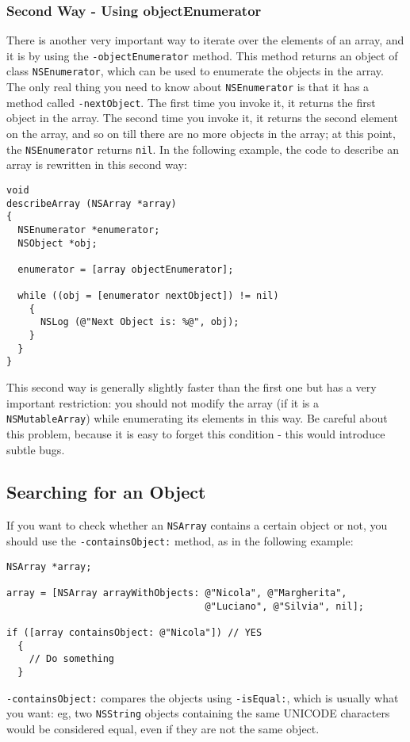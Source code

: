 \documentclass[a4paper]{article}
\begin{document}
\subsubsection{Second Way - Using objectEnumerator}
There is another very important way to iterate over the elements of an
array, and it is by using the \texttt{-objectEnumerator} method.  This
method returns an object of class \texttt{NSEnumerator}, which can be
used to enumerate the objects in the array.  The only real thing you
need to know about \texttt{NSEnumerator} is that it has a method
called \texttt{-nextObject}.  The first time you invoke it, it returns
the first object in the array.  The second time you invoke it, it
returns the second element on the array, and so on till there are no
more objects in the array; at this point, the \texttt{NSEnumerator}
returns \texttt{nil}.  In the following example, the code to describe
an array is rewritten in this second way:
\begin{verbatim}
void
describeArray (NSArray *array)
{
  NSEnumerator *enumerator;
  NSObject *obj;

  enumerator = [array objectEnumerator];

  while ((obj = [enumerator nextObject]) != nil)
    {
      NSLog (@"Next Object is: %@", obj);      
    }
  }
}
\end{verbatim}
This second way is generally slightly faster than the first one but
has a very important restriction: you should not modify the array (if
it is a \texttt{NSMutableArray}) while enumerating its elements in
this way.  Be careful about this problem, because it is easy to forget
this condition - this would introduce subtle bugs.

\subsection{Searching for an Object}
If you want to check whether an \texttt{NSArray} contains a certain
object or not, you should use the \texttt{-containsObject:} method, 
as in the following example: 
\begin{verbatim}
NSArray *array;

array = [NSArray arrayWithObjects: @"Nicola", @"Margherita",
                                   @"Luciano", @"Silvia", nil];

if ([array containsObject: @"Nicola"]) // YES
  {
    // Do something
  }
\end{verbatim}
\texttt{-containsObject:} compares the objects using
\texttt{-isEqual:}, which is usually what you want: eg, two
\texttt{NSString} objects containing the same UNICODE characters would
be considered equal, even if they are not the same object.
\end{document}
